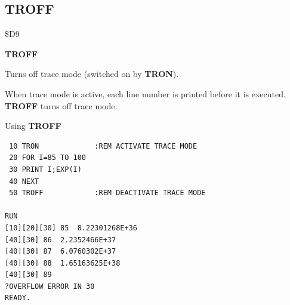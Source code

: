 \subsection{TROFF}
\begin{description}[leftmargin=2cm,style=nextline]
\item [Token:] \$D9
\item [Format:] {\bf TROFF}
\item [Usage:]  Turns off trace mode (switched on by {\bf TRON}).

                When trace mode is active, each line number is printed before
                it is executed. {\bf TROFF} turns off trace mode.

\item [Example:] Using {\bf TROFF}
\begin{tcolorbox}[colback=black,coltext=white]
\verbatimfont{\codefont}
\begin{verbatim}
 10 TRON             :REM ACTIVATE TRACE MODE
 20 FOR I=85 TO 100
 30 PRINT I;EXP(I)
 40 NEXT
 50 TROFF            :REM DEACTIVATE TRACE MODE

RUN
[10][20][30] 85  8.22301268E+36
[40][30] 86  2.2352466E+37
[40][30] 87  6.0760302E+37
[40][30] 88  1.65163625E+38
[40][30] 89
?OVERFLOW ERROR IN 30
READY.
\end{verbatim}
\end{tcolorbox}
\end{description}


\newpage
